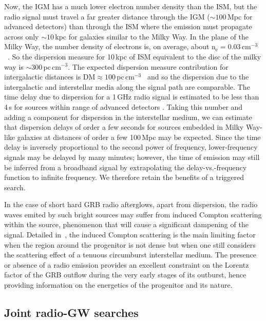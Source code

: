 \documentclass[epsf]{article}
\begin{document}
Now, the IGM has a much lower electron number density than the ISM, but the
radio signal must travel a far greater distance through the IGM ($\sim 100$\,Mpc
for advanced detectors) than through the ISM where the emission must propagate across
only $\sim 10$\,kpc for galaxies similar to the Milky Way. In the plane of
the Milky Way, the number density of electrons is, on average, about
$\mathrm{n_e=0.03\,cm^{-3}}$~\cite{thompson}.  So the dispersion
measure for 10\,kpc of ISM equivalent to the disc of
the milky way is $\mathrm{\sim 300\,pc\,cm^{-3}}$.  The expected dispersion
measure contribution for intergalactic distances is $\mathrm{DM} \approx 
100$\,pc\,cm$^{-3}$~\cite{skadoc,palmer} and so the dispersion due to the intergalactic and
interstellar media along the signal path are comparable.  The time
delay due to dispersion for a 1\,GHz radio signal is estimated to be
less than 4\,s for sources within range of advanced detectors \cite{laz}.
Taking this number and adding a component for dispersion in the
interstellar medium, we can estimate that dispersion delays of order
a few seconds for sources embedded in Milky Way-like galaxies at
distances of order a few 100\,Mpc may be expected.
Since the time delay is inversely proportional to the second power of frequency,
lower-frequency signals may be delayed by many minutes; however, the
time of emission may still be inferred from a broadband signal by
extrapolating the delay-vs.-frequency function to infinite frequency.
We therefore retain the benefits of a triggered search.

In the case of short hard GRB radio afterglows, apart from dispersion, the radio waves emited by such bright sources may suffer from induced Compton scattering within the source, phenomenon that will cause a significant dampening of the signal. Detailed in~\cite{Macquart:2007kv}, the induced Compton scattering is the main limiting factor when the region around the progenitor is not dense but when one still considers the scattering effect of a tenuous circumburst interstellar medium. The presence or absence of a radio emission provides an excellent constraint on the Lorentz factor of the GRB outflow during the very early stages of its outburst, hence providing information on the energetics of the progenitor and its nature. 


\subsection{Joint radio-GW searches}
\label{sec:search}
\end{document}
